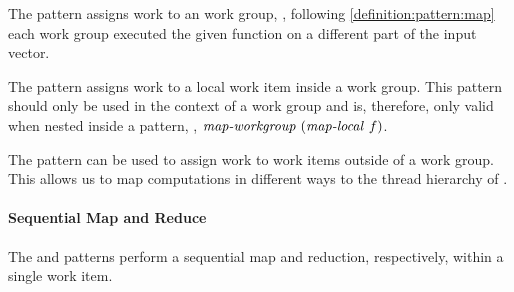 The \mapWorkgroup pattern assigns work to an \OpenCL work group, \ie, following \autoref{definition:pattern:map} each \OpenCL work group executed the given function on a different part of the input vector.

The \mapLocal pattern assigns work to a local work item inside a work group.
This pattern should only be used in the context of a work group and is, therefore, only valid when nested inside a \mapWorkgroup pattern, \eg, $\text{\textit{map-workgroup}}\ (\text{\textit{map-local}}\ f)$.

The \mapGlobal pattern can be used to assign work to work items outside of a work group.
This allows us to map computations in different ways to the thread hierarchy of \OpenCL.


\paragraph{Sequential Map and Reduce}
The \mapSeq and \reduceSeq patterns perform a sequential map and reduction, respectively, within a single work item.

